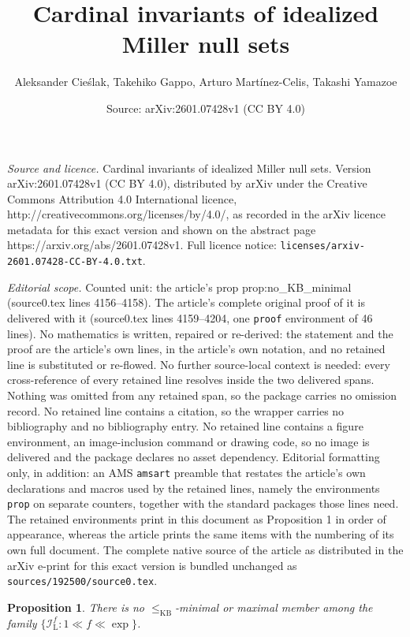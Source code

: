 \documentclass[10pt,a4paper]{amsart}
\title{Cardinal invariants of idealized Miller null sets}
\author{Aleksander Cieślak, Takehiko Gappo, Arturo Martínez-Celis, Takashi Yamazoe}
\date{Source: arXiv:2601.07428v1 (CC BY 4.0)}
\newtheorem{prop}{Proposition}
\begin{document}
\maketitle

\noindent\emph{Source and licence.} Cardinal invariants of idealized Miller null sets. Version arXiv:2601.07428v1 (CC BY 4.0), distributed by arXiv under the Creative Commons Attribution 4.0 International licence, http://creativecommons.org/licenses/by/4.0/, as recorded in the arXiv licence metadata for this exact version and shown on the abstract page https://arxiv.org/abs/2601.07428v1. Full licence notice: \texttt{licenses/arxiv-2601.07428-CC-BY-4.0.txt}.\par\smallskip

\noindent\textit{Editorial scope.} Counted unit: the article's prop prop:no\_KB\_minimal (source0.tex lines 4156--4158). The article's complete original proof of it is delivered with it (source0.tex lines 4159--4204, one \texttt{proof} environment of 46 lines). No mathematics is written, repaired or re-derived: the statement and the proof are the article's own lines, in the article's own notation, and no retained line is substituted or re-flowed.  No further source-local context is needed: every cross-reference of every retained line resolves inside the two delivered spans.  Nothing was omitted from any retained span, so the package carries no omission record.  No retained line contains a citation, so the wrapper carries no bibliography and no bibliography entry.  No retained line contains a figure environment, an image-inclusion command or drawing code, so no image is delivered and the package declares no asset dependency.  Editorial formatting only, in addition: an AMS \texttt{amsart} preamble that restates the article's own declarations and macros used by the retained lines, namely the environments \texttt{prop} on separate counters, together with the standard packages those lines need.  The retained environments print in this document as Proposition 1 in order of appearance, whereas the article prints the same items with the numbering of its own full document.  The complete native source of the article as distributed in the arXiv e-print for this exact version is bundled unchanged as \texttt{sources/192500/source0.tex}.
    \begin{prop}\label{prop:no_KB_minimal}
	   There is no $\leq_{\mathrm{KB}}$-minimal or maximal member among the family $\{\mathscr{I}_{\mathrm{L}}^f:1\ll f\ll\exp\}$.
    \end{prop}
\end{document}

